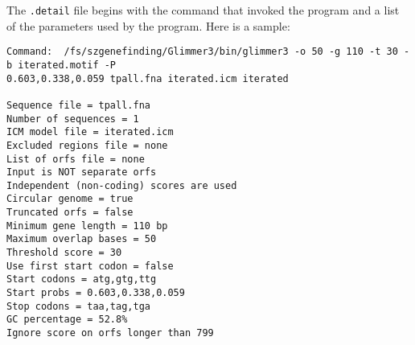 \documentclass[fleqn,titlepage,11pt]{article}
\def\Pg#1{\texttt{#1}}
\begin{document}
The \Pg{.detail} file begins with the command that invoked the program and
a list of the parameters
used by the program.  Here is a sample:
\BSV
\begin{verbatim}
Command:  /fs/szgenefinding/Glimmer3/bin/glimmer3 -o 50 -g 110 -t 30 -b iterated.motif -P 
0.603,0.338,0.059 tpall.fna iterated.icm iterated

Sequence file = tpall.fna
Number of sequences = 1
ICM model file = iterated.icm
Excluded regions file = none
List of orfs file = none
Input is NOT separate orfs
Independent (non-coding) scores are used
Circular genome = true
Truncated orfs = false
Minimum gene length = 110 bp
Maximum overlap bases = 50
Threshold score = 30
Use first start codon = false
Start codons = atg,gtg,ttg
Start probs = 0.603,0.338,0.059
Stop codons = taa,tag,tga
GC percentage = 52.8%
Ignore score on orfs longer than 799
\end{verbatim}
\ESV
\end{document}

